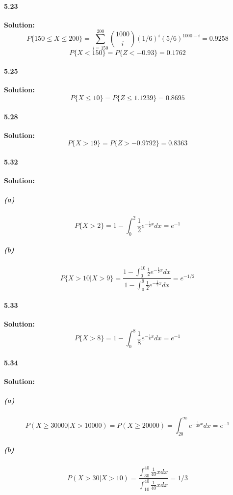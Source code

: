 \documentclass[11pt]{article}
\begin{document}
	\paragraph{5.23}\textbf{Solution:}
		\[P\{150 \leq X \leq 200\} = \sum_{i = 150}^{200} \binom{1000}{i}(1/6)^i(5/6)^{1000 - i} = 0.9258\]
		\[P\{X < 150\} = P\{Z < -0.93\} = 0.1762\]
	\paragraph{5.25}\textbf{Solution:}
		\[P\{X \leq 10\} = P\{Z \leq 1.1239\} = 0.8695\]
	\paragraph{5.28}\textbf{Solution:}
		\[P\{X > 19\} = P\{Z > -0.9792\} = 0.8363\]
	\paragraph{5.32}\textbf{Solution:}
		\subparagraph{(a)}
			\[P\{X > 2\} = 1 -\int_0^2 \frac{1}{2} e^{-\frac{1}{2}x}dx = e^{-1}\]
		\subparagraph{(b)}
			\[P\{X > 10|X > 9\} = \frac{1 - \int_{0}^{10} \frac{1}{2} e^{-\frac{1}{2}x}dx}{1 - \int_{0}^{9} \frac{1}{2} e^{-\frac{1}{2}x}dx} = e^{-1/2}\]
	\paragraph{5.33}\textbf{Solution:}
		\[P\{X > 8\} = 1 - \int_0^8 \frac{1}{8}e^{-\frac{1}{8}x}dx = e^{-1}\]
	\paragraph{5.34}\textbf{Solution:}
		\subparagraph{(a)}
			\[P(X \geq 30000 | X > 10000) = P(X \geq 20000) = \int_{20}^{\infty} e^{-\frac{1}{20}x}dx = e^{-1}\]
		\subparagraph{(b)}
			\[P(X > 30 | X > 10) = \frac{\int_{30}^{40}\frac{1}{40}xdx}{\int_{10}^{40}\frac{1}{40}xdx} = 1/3\]
\end{document}
